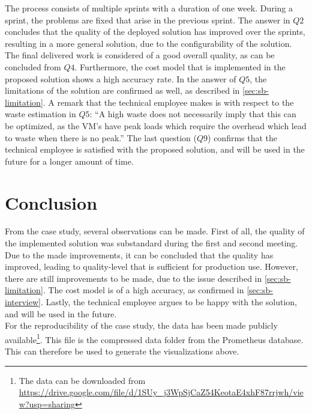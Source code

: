 \noindent
The process consists of multiple sprints with a duration of one week. During a sprint, the problems are fixed that arise in the previous sprint. The answer in $Q2$ concludes that the quality of the deployed solution has improved over the sprints, resulting in a more general solution, due to the configurability of the solution.\\

\noindent
The final delivered work is considered of a good overall quality, as can be concluded from $Q4$. Furthermore, the cost model that is implemented in the proposed solution shows a high accuracy rate. In the answer of $Q5$, the limitations of the solution are confirmed as well, as described in \autoref{sec:sb-limitation}. A remark that the technical employee makes is with respect to the waste estimation in $Q5$: ``A high waste does not necessarily imply that this can be optimized, as the VM's have peak loads which require the overhead which lead to waste when there is no peak.'' The last question ($Q9$) confirms that the technical employee is satisfied with the proposed solution, and will be used in the future for a longer amount of time.

\section{Conclusion} \label{sec:sb-evaluation}
From the case study, several observations can be made. First of all, the quality of the implemented solution was substandard during the first and second meeting. Due to the made improvements, it can be concluded that the quality has improved, leading to quality-level that is sufficient for production use. However, there are still improvements to be made, due to the issue described in \autoref{sec:sb-limitation}. The cost model is of a high accuracy, as confirmed in \autoref{sec:sb-interview}. Lastly, the technical employee argues to be happy with the solution, and will be used in the future.\\

\noindent
For the reproducibility of the case study, the data has been made publicly available\footnote{The data can be downloaded from \url{https://drive.google.com/file/d/1SUy_j3WpSjCaZ54KeotaE4xhF87rrjwh/view?usp=sharing}}. This file is the compressed data folder from the Prometheus database. This can therefore be used to generate the visualizations above.
